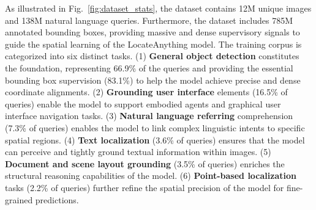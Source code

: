 As illustrated in Fig.~\ref{fig:dataset_stats}, the dataset contains 12M unique images and 138M natural language queries. Furthermore, the dataset includes 785M annotated bounding boxes, providing massive and dense supervisory signals to guide the spatial learning of the LocateAnything model. The training corpus is categorized into six distinct tasks. (1) \textbf{General object detection} constitutes the foundation, representing 66.9\% of the queries and providing the essential bounding box supervision (83.1\%) to help the model achieve precise and dense coordinate alignments. (2) \textbf{Grounding user interface} elements (16.5\% of queries) enable the model to support embodied agents and graphical user interface navigation tasks. (3) \textbf{Natural language referring} comprehension (7.3\% of queries) enables the model to link complex linguistic intents to specific spatial regions. (4) \textbf{Text localization} (3.6\% of queries) ensures that the model can perceive and tightly ground textual information within images. (5) \textbf{Document and scene layout grounding} (3.5\% of queries) enriches the structural reasoning capabilities of the model. (6) \textbf{Point-based localization} tasks (2.2\% of queries) further refine the spatial precision of the model for fine-grained predictions.
